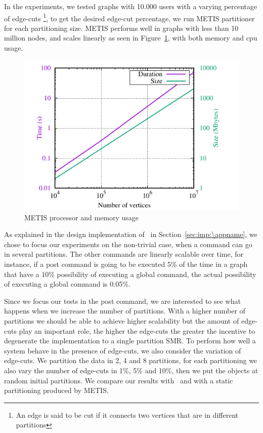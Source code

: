 In the experiments, we tested graphs with 10.000 users with a varying percentage of edge-cuts \footnote{An edge is said to be cut if it connects two vertices that are in different partitions}, to get the desired edge-cut
percentage, we run METIS partitioner for each partitioning size. METIS performs well in graphs with less than 10 million nodes, and scales linearly as seen in Figure~\ref{fig:metis_size_time}, with both memory and cpu usage.

\begin{figure}[ht!]
  \centering
    \includegraphics[width=\columnwidth]{figures/metis_size_time}
	\caption{METIS processor and memory usage}
	\label{fig:metis_size_time}
\end{figure}

As explained in the design implementation of \appname\ in Section~\ref{sec:imp:\appname}, we chose to focus our
experiments on the non-trivial case, when a command can go in several partitions. The other commands are linearly
scalable over time, for instance, if a post command is going to be executed 5\% of the time in a graph that have a 10\%
possibility of executing a global command, the actual possibility of executing a global command is 0.05\%.

Since we focus our tests in the post command, we are interested to see what happens when we increase the number of
partitions. With a higher number of partitions we should be able to achieve higher scalability but the amount of edge-cuts
play an important role, the higher the edge-cuts the greater the incentive to degenerate the implementation to a single
partition SMR. To perform how well a system behave in the presence of edge-cuts, we also consider the variation of
edge-cuts. We partition the data in 2, 4 and 8 partitions, for each partitioning we also vary the number of edge-cuts 
in 1\%, 5\% and 10\%, then we put the objects at random initial partitions.
We compare our results with \dssmr\ and \ssmr with a static partitioning produced by METIS.

